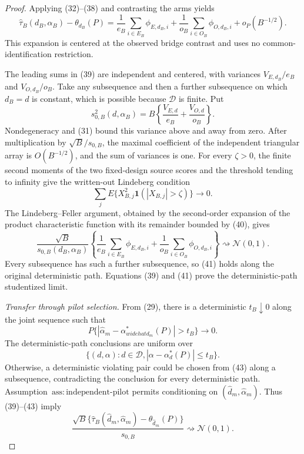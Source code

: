 \documentclass{article}
\begin{document}
\begin{proof}
Applying (32)--(38) and contrasting the arms yields
\[
 \widehat\tau_B(d_B,\alpha_B)-\theta_{d_B}(P)
 =\frac1{e_B}\sum_{i\in E_B}\phi_{E,d_B,i}
 +\frac1{o_B}\sum_{i\in O_B}\phi_{O,d_B,i}
 +o_P(B^{-1/2}).                                               \tag{39}
\]
This expansion is centered at the observed bridge contrast and uses no common-identification restriction.

The leading sums in (39) are independent and centered, with variances \(V_{E,d_B}/e_B\) and \(V_{O,d_B}/o_B\).  Take any subsequence and then a further subsequence on which \(d_B=d\) is constant, which is possible because \(\mathcal D\) is finite.  Put
\[
 s_{0,B}^2(d,\alpha_B)
 =B\left\{\frac{V_{E,d}}{e_B}+\frac{V_{O,d}}{o_B}\right\}.
\]
Nondegeneracy and (31) bound this variance above and away from zero.  After multiplication by \(\sqrt B/s_{0,B}\), the maximal coefficient of the independent triangular array is \(O(B^{-1/2})\), and the sum of variances is one.  For every \(\zeta>0\), the finite second moments of the two fixed-design source scores and the threshold tending to infinity give the written-out Lindeberg condition
\[
 \sum_j E\{X_{B,j}^2\mathbf1(|X_{B,j}|>\zeta)\}\longrightarrow0. \tag{40}
\]
The Lindeberg--Feller argument, obtained by the second-order expansion of the product characteristic function with its remainder bounded by (40), gives
\[
 \frac{\sqrt B}{s_{0,B}(d_B,\alpha_B)}
 \left\{
 \frac1{e_B}\sum_{i\in E_B}\phi_{E,d_B,i}
 +\frac1{o_B}\sum_{i\in O_B}\phi_{O,d_B,i}
 \right\}\rightsquigarrow\mathcal N(0,1).                  \tag{41}
\]
Every subsequence has such a further subsequence, so (41) holds along the original deterministic path.  Equations (39) and (41) prove the deterministic-path studentized limit.

\emph{Transfer through pilot selection.}  From (29), there is a deterministic \(t_B\downarrow0\) along the joint sequence such that
\[
 P\{|\widehat\alpha_m-\alpha_{widehat d_m}^*(P)|>t_B\}\longrightarrow0. \tag{42}
\]
The deterministic-path conclusions are uniform over
\[
 \{(d,\alpha):d\in\mathcal D,
 |\alpha-\alpha_d^*(P)|\le t_B\}.                            \tag{43}
\]
Otherwise, a deterministic violating pair could be chosen from (43) along a subsequence, contradicting the conclusion for every deterministic path.  Assumption~\(\mathrm{ass{:}independent\text{-}pilot}\) permits conditioning on \((\widehat d_m,\widehat\alpha_m)\).  Thus (39)--(43) imply
\[
 \frac{\sqrt B\{\widehat\tau_B(\widehat d_m,\widehat\alpha_m)
 -\theta_{\widehat d_m}(P)\}}{s_{0,B}}
 \rightsquigarrow\mathcal N(0,1).                            \tag{44}
\]


\end{proof}
\end{document}
